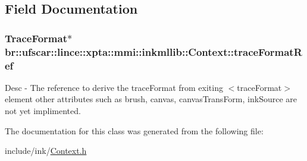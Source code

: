 \subsection{Field Documentation}
\hypertarget{classbr_1_1ufscar_1_1lince_1_1xpta_1_1mmi_1_1inkmllib_1_1Context_a8dccf5d66bcb8872945e80eab527f6e1}{
\subsubsection[{traceFormatRef}]{\setlength{\rightskip}{0pt plus 5cm}TraceFormat$\ast$ {\bf br::ufscar::lince::xpta::mmi::inkmllib::Context::traceFormatRef}}}
\label{classbr_1_1ufscar_1_1lince_1_1xpta_1_1mmi_1_1inkmllib_1_1Context_a8dccf5d66bcb8872945e80eab527f6e1}


Desc -\/ The reference to derive the traceFormat from exiting $<$traceFormat$>$ element other attributes such as brush, canvas, canvasTransForm, inkSource are not yet implimented. 



The documentation for this class was generated from the following file:\begin{DoxyCompactItemize}
\item 
include/ink/\hyperlink{Context_8h}{Context.h}\end{DoxyCompactItemize}
